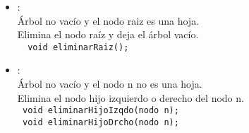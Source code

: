 \begin{itemize}
  \item {}:\\
   Árbol no vacío y el nodo raiz es una hoja.\\
   Elimina el nodo raíz y deja el árbol vacío.\\
  \verb|  void eliminarRaiz();|

  \item {}:\\
   Árbol no vacío y el nodo n no es una hoja.\\
   Elimina el nodo hijo izquierdo o derecho del nodo n.\\
  \verb| void eliminarHijoIzqdo(nodo n);|\\
  \verb| void eliminarHijoDrcho(nodo n);|
\end{itemize}

